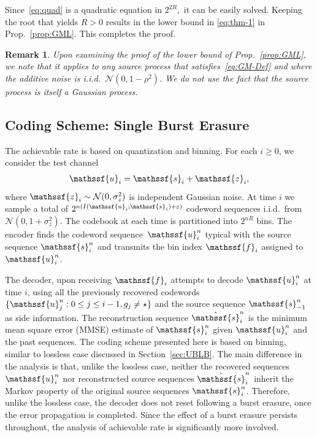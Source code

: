 \documentclass[journal, twocolumn, 10pt]{IEEEtran}
\newtheorem{remark}{Remark}
\newcommand{\cN}{{\mathcal{N}}}
\newcommand{\eps}{\varepsilon}
\newcommand{\rvf}{{\mathssf{f}}}    %
\newcommand{\rvs}{{\mathssf{s}}}    %
\newcommand{\rvu}{{\mathssf{u}}}    %
\newcommand{\rvz}{{\mathssf{z}}}    %
\begin{document}
Since~\eqref{eq:quad} is a quadratic equation in $2^{2R},$ it can be easily solved. Keeping the root that yields $R>0$ results in the lower bound in \eqref{eq:thm-1} in Prop.~\ref{prop:GML}. This completes the proof.  

\begin{remark}
Upon examining the proof of the lower bound of Prop.~\ref{prop:GML}, we note that it applies to any source process that satisfies~\eqref{eq:GM-Def} and where the additive noise is i.i.d.\ $\cN(0, 1-\rho^2)$. We do not use the fact that the source process is itself a Gaussian process. 
\end{remark}

\subsection{Coding Scheme: Single Burst Erasure}
\label{sec:UpperGM}
The achievable rate is based on quantization and binning. 
For each $i\ge0$, we consider the test channel
\begin{align}
\rvu_{i} = \rvs_{i} + \rvz_{i},\label{eq:testchannel}
\end{align} where $\rvz_{i} \sim \cN(0,\sigma^2_{z})$ is independent Gaussian noise.
At time $i$ we sample a total of $2^{n{(I(\rvu_i;\rvs_i)+\eps)}}$ codeword sequences i.i.d.\ from $\cN(0, 1+\sigma_z^2)$. 
The codebook at each time is partitioned into $2^{nR}$ bins. The encoder finds the codeword  sequence~$\rvu_{i}^n$ typical with the source sequence $\rvs_{i}^n$ and transmits the bin index $\rvf_{i}$ assigned to $\rvu_{i}^n$. 


The decoder, upon receiving $\rvf_i$  attempts to decode  $\rvu^n_{i}$ at time $i$, using all the previously recovered codewords $\{\rvu^n_j:0\le j \le i-1, g_{j}\neq \star\}$ and the source sequence $\rvs_{-1}^n$ as side information.  The reconstruction sequence $\hat{\rvs}_{i}^n$  is the minimum mean square error (MMSE) estimate of $\rvs_{i}^n$ given $\rvu_i^n$ and the past sequences.  The coding scheme presented here is based on binning, similar to lossless case discussed in Section~\ref{sec:UBLB}. The main difference in the analysis is that, unlike the lossless case, neither the recovered sequences $\rvu^n_{i}$ nor reconstructed source sequences $\hat{\rvs}^n_{i}$ inherit the Markov property of the original source sequences $\rvs^n_{i}$. Therefore, unlike the lossless case, the decoder does not reset following a burst erasure, once the error propagation is completed. Since the effect of a burst erasure persists throughout, the analysis of achievable rate is significantly more involved.
  
\end{document}
